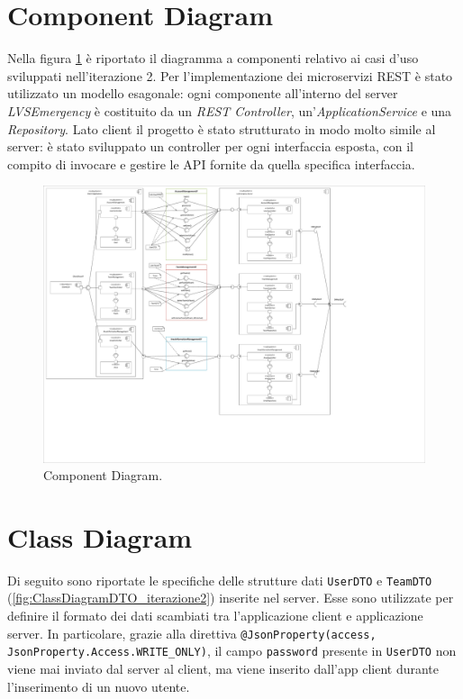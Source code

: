 \section{Component Diagram}
Nella figura \ref{fig:ComponentDiagram_iterazione2} è riportato il diagramma a componenti relativo ai casi d'uso sviluppati nell'iterazione 2. Per l'implementazione dei microservizi REST è stato utilizzato un modello esagonale: ogni componente all'interno del server \textit{LVSEmergency} è costituito da un \textit{REST Controller}, un'\textit{ApplicationService} e una \textit{Repository}.
Lato client il progetto è stato strutturato in modo molto simile al server: è stato sviluppato un controller per ogni interfaccia esposta, con il compito di invocare e gestire le API fornite da quella specifica interfaccia. 

\begin{figure}[h!]
	\centering
	\includegraphics[width=1\linewidth]{./Iterazione 2/OtherFiles/UML - Component View}
	\caption{Component Diagram.}
	\label{fig:ComponentDiagram_iterazione2}
\end{figure}

\clearpage

\section{Class Diagram}
Di seguito sono riportate le specifiche delle strutture dati \texttt{UserDTO} e \texttt{TeamDTO} (\Fig\ref{fig:ClassDiagramDTO_iterazione2}) inserite nel server. Esse sono utilizzate per definire il formato dei dati scambiati tra l'applicazione client e applicazione server. In particolare, grazie alla direttiva \texttt{@JsonProperty(access, JsonProperty.Access.WRITE\_ONLY)}, il campo \texttt{password} presente in \texttt{UserDTO} non viene mai inviato dal server al client, ma viene inserito dall'app client durante l'inserimento di un nuovo utente.  

